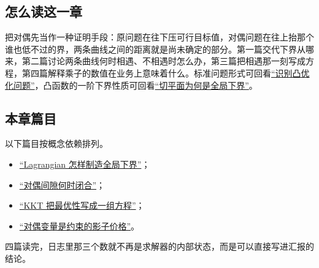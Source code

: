 \subsection{怎么读这一章}

把对偶先当作一种证明手段：原问题在往下压可行目标值，对偶问题在往上抬那个谁也低不过的界，两条曲线之间的距离就是尚未确定的部分。第一篇交代下界从哪来，第二篇讨论两条曲线何时相遇、不相遇时怎么办，第三篇把相遇那一刻写成方程，第四篇解释乘子的数值在业务上意味着什么。标准问题形式可回看\hyperref[ch:074]{``识别凸优化问题''}，凸函数的一阶下界性质可回看\hyperref[sec:09-Convex-Optimization/03-Convex-Functions/02]{``切平面为何是全局下界''}。

\subsection{本章篇目}

以下篇目按概念依赖排列。

\begin{itemize}
\tightlist
\item \hyperref[sec:09-Convex-Optimization/05-Duality/01]{``Lagrangian 怎样制造全局下界''}；
\item \hyperref[sec:09-Convex-Optimization/05-Duality/02]{``对偶间隙何时闭合''}；
\item \hyperref[sec:09-Convex-Optimization/05-Duality/03]{``KKT 把最优性写成一组方程''}；
\item \hyperref[sec:09-Convex-Optimization/05-Duality/04]{``对偶变量是约束的影子价格''}。
\end{itemize}

四篇读完，日志里那三个数就不再是求解器的内部状态，而是可以直接写进汇报的结论。
